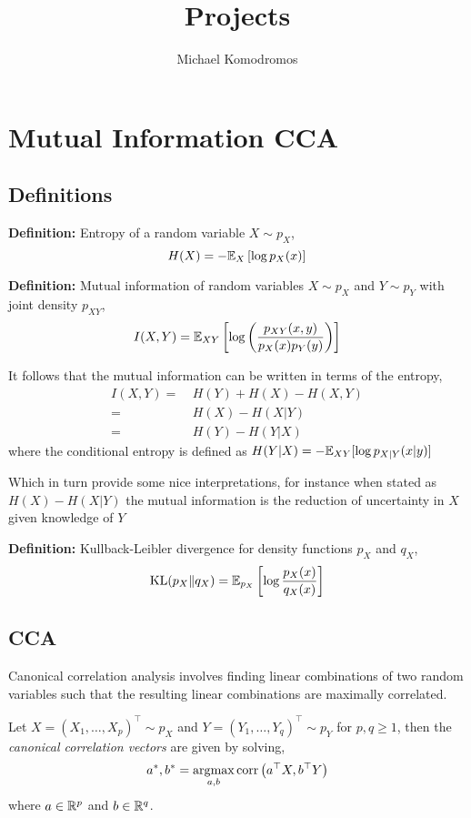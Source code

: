 \documentclass[12pt]{article}
\author{Michael Komodromos}
\title{Projects}
\begin{document}
   
\section{Mutual Information CCA}

\subsection{Definitions}

\textbf{Definition:} Entropy of a random variable $X \sim p_X$,
\begin{equation}
H(X) = - \mathbb{E}_X \left[\log p_X (x) \right]
\end{equation}

\textbf{Definition:} Mutual information of random variables $X \sim p_X$ and $Y \sim p_Y$ with joint density $p_{XY}$,
\begin{equation}
    I(X, Y) = \mathbb{E}_{XY} \left[ \log \left( \frac{p_{XY}(x, y)}{p_X(x) p_Y(y)} \right) \right]
\end{equation}

It follows that the mutual information can be written in terms of the entropy,
\begin{align}
    I(X, Y)
    =&\ H(Y) + H(X) - H(X, Y) \\
    =&\ H(X) - H(X | Y) \\
    =&\ H(Y) - H(Y | X)
\end{align}
where the conditional entropy is defined as $H(Y|X) = - \mathbb{E}_{XY} [ \log p_{X | Y}(x | y)]$

Which in turn provide some nice interpretations, for instance when stated as $H(X) - H(X | Y)$ the mutual information is the reduction of uncertainty in $X$ given knowledge of $Y$ \citep{Cover2006}

\textbf{Definition:} Kullback-Leibler divergence for density functions $p_X$ and $q_X$,
\begin{equation}
\text{KL}(p_X \| q_X) = \mathbb{E}_{p_X} \left[ \log \frac{p_X(x)}{q_X(x)} \right]
\end{equation}

\subsection{CCA}

Canonical correlation analysis involves finding linear combinations of two random variables such that the resulting linear combinations are maximally correlated.

Let $X = (X_1, \dots, X_p)^\top \sim p_X$ and $Y = (Y_1, \dots, Y_q)^\top \sim p_Y$ for $p, q \geq 1$, then the \textit{canonical correlation vectors} are given by solving,
\begin{equation} \label{eq:cca}
    a^\ast, b^\ast = \underset{a, b}{{\arg\!\max}} \operatorname{corr} \left(a^\top X, b^\top Y \right)
\end{equation}
where $a \in \mathbb{R}^p$ and $b \in \mathbb{R}^q$.
\end{document}
